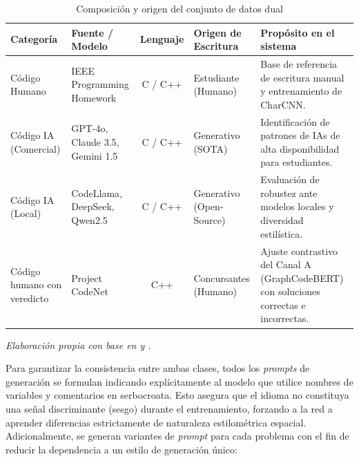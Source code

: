 \begin{table}[ht]
	\centering
	\caption{Composición y origen del conjunto de datos dual}
	\label{tab:composicion_dataset}
	\renewcommand{\arraystretch}{1.6}
	\begin{tabularx}{\textwidth}{>{\raggedright\arraybackslash}p{2.8cm} >{\raggedright\arraybackslash}p{2.8cm} c >{\raggedright\arraybackslash}p{3cm} >{\raggedright\arraybackslash}X}
		\toprule
		\textbf{Categoría}    & \textbf{Fuente / Modelo}                             & \textbf{Lenguaje} & \textbf{Origen de Escritura} & \textbf{Propósito en el sistema}                                           \\
		\midrule
		Código Humano         & IEEE Programming Homework \cite{Ljubovic2020Dataset} & C / C++           & Estudiante (Humano)          & Base de referencia de escritura manual y entrenamiento de CharCNN.         \\

		\addlinespace

		Código IA (Comercial) & GPT-4o, Claude 3.5, Gemini 1.5                       & C / C++           & Generativo (SOTA)            & Identificación de patrones de IAs de alta disponibilidad para estudiantes. \\

		\addlinespace

		Código IA (Local)     & CodeLlama, DeepSeek, Qwen2.5                         & C / C++           & Generativo (Open-Source)     & Evaluación de robustez ante modelos locales y diversidad estilística.      \\

		\addlinespace

		Código humano con veredicto & Project CodeNet \cite{Puri2021CodeNet}         & C++               & Concursantes (Humano)        & Ajuste contrastivo del Canal A (GraphCodeBERT) con soluciones correctas e incorrectas. \\
		\bottomrule
	\end{tabularx}
	\smallskip
	\footnotesize\textit{Elaboración propia con base en \cite{Ljubovic2020Dataset} y \cite{Puri2021CodeNet}.}
\end{table}

Para garantizar la consistencia entre ambas clases, todos los \textit{prompts} de generación se formulan indicando explícitamente al modelo que utilice nombres de variables y comentarios en serbocroata. Esto asegura que el idioma no constituya una señal discriminante (sesgo) durante el entrenamiento, forzando a la red a aprender diferencias estrictamente de naturaleza estilométrica espacial. Adicionalmente, se generan variantes de \textit{prompt} para cada problema con el fin de reducir la dependencia a un estilo de generación único:

